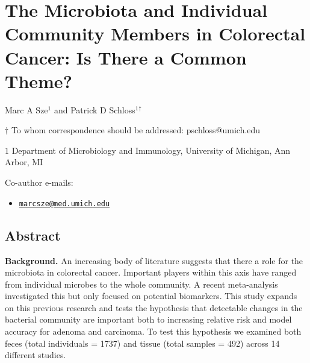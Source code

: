 \documentclass[12pt,]{article}
\title{}
\author{}
\date{}
\providecommand{\tightlist}{%
  \setlength{\itemsep}{0pt}\setlength{\parskip}{0pt}}
\begin{document}
\section{The Microbiota and Individual Community Members in Colorectal
Cancer: Is There a Common
Theme?}\label{the-microbiota-and-individual-community-members-in-colorectal-cancer-is-there-a-common-theme}

\begin{center}
\vspace{25mm}

Marc A Sze${^1}$ and Patrick D Schloss${^1}$${^\dagger}$

\vspace{20mm}

$\dagger$ To whom correspondence should be addressed: pschloss@umich.edu

$1$ Department of Microbiology and Immunology, University of Michigan, Ann Arbor, MI




\end{center}

Co-author e-mails:

\begin{itemize}
\tightlist
\item
  \href{mailto:marcsze@med.umich.edu}{\nolinkurl{marcsze@med.umich.edu}}
\end{itemize}

\newpage

\linenumbers

\subsection{Abstract}\label{abstract}

\textbf{Background.} An increasing body of literature suggests that
there a role for the microbiota in colorectal cancer. Important players
within this axis have ranged from individual microbes to the whole
community. A recent meta-analysis investigated this but only focused on
potential biomarkers. This study expands on this previous research and
tests the hypothesis that detectable changes in the bacterial community
are important both to increasing relative risk and model accuracy for
adenoma and carcinoma. To test this hypothesis we examined both feces
(total individuals = 1737) and tissue (total samples = 492) across 14
different studies.
\end{document}

